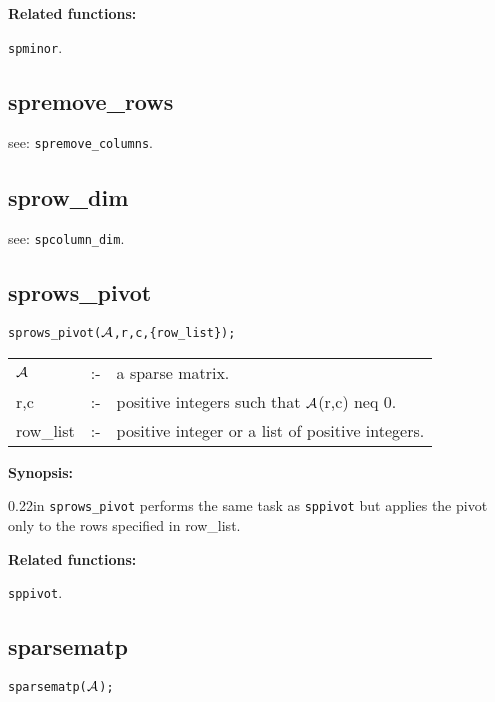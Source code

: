 {\bf Related functions:}

\hspace*{0.175in} {\tt spminor}.


\subsection{spremove\_rows}

\hspace*{0.175in} see: {\tt spremove\_columns}.


\subsection{sprow\_dim}

\hspace{0.175in} see: {\tt spcolumn\_dim}.


\subsection{sprows\_pivot}

\hspace*{0.175in} {\tt sprows\_pivot(${\cal A}$,r,c,\{row\_list\});}

\hspace*{0.1in}  
\begin{tabular}{l l l} 
${\cal A}$ &:-& a sparse matrix. \\
r,c        &:-& positive integers such that ${\cal A}$(r,c) neq 0.\\
row\_list  &:-& positive integer or a list of positive integers.
\end{tabular}

{\bf Synopsis:}

\begin{addtolength}{\leftskip}{0.22in}
{\tt sprows\_pivot} performs the same task as {\tt sppivot} but applies 
the pivot only to the rows specified in row\_list.

\end{addtolength}

{\bf Related functions:}

\hspace*{0.175in} {\tt sppivot}.

\subsection{sparsematp}

\hspace*{0.175in} {\tt sparsematp(${\cal A}$);}

